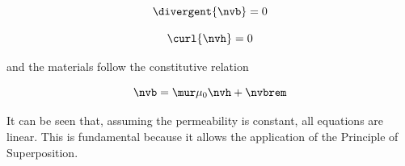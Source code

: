 \documentclass[article,brazil,english]{techreport}
\begin{document}
\begin{equation}
  \label{eq:4}
  \divergent{\nvb} = 0
\end{equation}

\begin{equation}
  \label{eq:5}
  \curl{\nvh} = 0
\end{equation}

\noindent and the materials follow the constitutive relation

\begin{equation}
  \label{eq:6}
  \nvb = \mur \mu_0 \nvh + \nvbrem
\end{equation}

It can be seen that, assuming the permeability is constant, all equations are linear. This is fundamental because it allows the application of the Principle of Superposition.



\postextual


\end{document}
